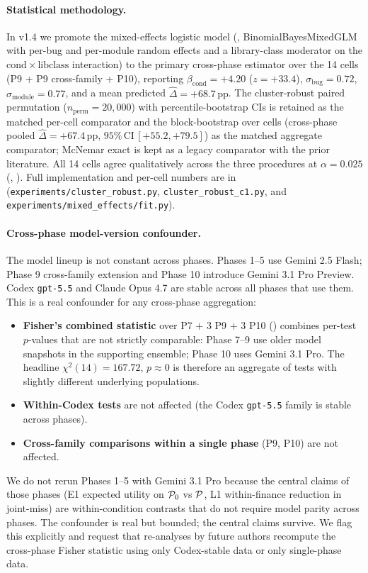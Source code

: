 \paragraph{Statistical methodology.} In v1.4 we promote the mixed-effects logistic model (, BinomialBayesMixedGLM with per-bug and per-module random effects and a library-class moderator on the $\mathrm{cond}\times\mathrm{libclass}$ interaction) to the primary cross-phase estimator over the 14 cells (P9 + P9 cross-family + P10), reporting $\beta_{\mathrm{cond}} = +4.20$ ($z = +33.4$), $\sigma_{\mathrm{bug}} = 0.72$, $\sigma_{\mathrm{module}} = 0.77$, and a mean predicted $\widehat{\Delta} = +68.7\,\mathrm{pp}$. The cluster-robust paired permutation ($n_{\text{perm}} = 20{,}000$) with percentile-bootstrap CIs is retained as the matched per-cell comparator and the block-bootstrap over cells (cross-phase pooled $\widehat{\Delta} = +67.4\,\mathrm{pp}$, $95\%\,\mathrm{CI}\,[+55.2,+79.5]$) as the matched aggregate comparator; McNemar exact is kept as a legacy comparator with the prior literature. All 14 cells agree qualitatively across the three procedures at $\alpha = 0.025$ (, ). Full implementation and per-cell numbers are in  (\texttt{experiments/cluster\_robust.py}, \texttt{cluster\_robust\_c1.py}, and \texttt{experiments/mixed\_effects/fit.py}).

\paragraph{Cross-phase model-version confounder.} The model lineup is not constant across phases. Phases 1--5 use Gemini 2.5 Flash; Phase 9 cross-family extension and Phase 10 introduce Gemini 3.1 Pro Preview. Codex \texttt{gpt-5.5} and Claude Opus 4.7 are stable across all phases that use them. This is a real confounder for any cross-phase aggregation:
\begin{itemize}[leftmargin=2em]
\item \textbf{Fisher's combined statistic} over P7 $+$ 3 P9 $+$ 3 P10 () combines per-test $p$-values that are not strictly comparable: Phase 7--9 use older model snapshots in the supporting ensemble; Phase 10 uses Gemini 3.1 Pro. The headline $\chi^2(14) = 167.72$, $p \approx 0$ is therefore an aggregate of tests with slightly different underlying populations.
\item \textbf{Within-Codex tests} are not affected (the Codex \texttt{gpt-5.5} family is stable across phases).
\item \textbf{Cross-family comparisons within a single phase} (P9, P10) are not affected.
\end{itemize}
We do not rerun Phases 1--5 with Gemini 3.1 Pro because the central claims of those phases (E1 expected utility on $\mathcal{P}_0$ vs $\mathcal{P}$, L1 within-finance reduction in joint-miss) are within-condition contrasts that do not require model parity across phases. The confounder is real but bounded; the central claims survive. We flag this explicitly and request that re-analyses by future authors recompute the cross-phase Fisher statistic using only Codex-stable data or only single-phase data.

